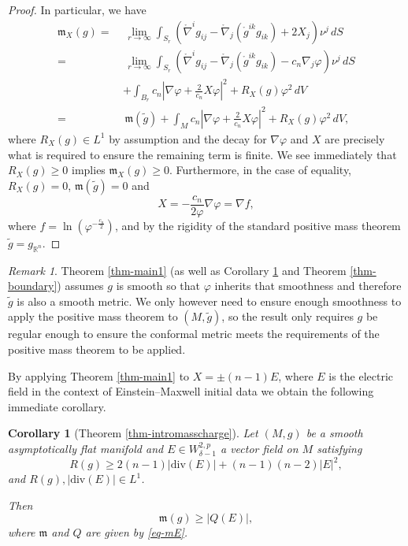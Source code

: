 \documentclass[a4paper,11pt,reqno]{amsart}
\theoremstyle{plain}
\newtheorem{cor}[thm]{Corollary}
\theoremstyle{definition}
\theoremstyle{remark}
\newtheorem{rem}[thm]{Remark}
\newcommand{\m}{\mathfrak{m}}
\def\onabla{\mathring \nabla}
\numberwithin{equation}{section}
\begin{document}
\begin{proof}
In particular, we have
\begin{align}
	\m_X(g)=\,&\,\lim_{r\to \infty}\int_{S_r} \left(\onabla^i g_{ij}-\onabla_j(\mathring g^{ik}g_{ik})+2X_j\right)\nu^j\,dS\nonumber\\\nonumber
	=\,&\, 	\lim_{r\to \infty}\int_{S_r} \left(\onabla^i g_{ij}-\onabla_j(\mathring g^{ik}g_{ik})-c_n\nabla_j\varphi\right)\nu^j\,dS\\\nonumber
	&+\int_{B_r} c_n\left| \nabla\varphi+\frac{2}{c_n}X\varphi\right|^2+R_X(g)\varphi^2\,dV\\
	=\,&\,\m(\widetilde g)+\int_{M} c_n\left| \nabla\varphi+\frac{2}{c_n}X\varphi\right|^2+R_X(g)\varphi^2\,dV,\label{eq-massdefect}
\end{align}
where $R_X(g)\in L^1$ by assumption and the decay for $\nabla\varphi$ and $X$ are precisely what is required to ensure the remaining term is finite. We see immediately that $R_X(g)\geq0$ implies $\m_X(g)\geq0$. Furthermore, in the case of equality, $R_X(g)=0$, $\m(\widetilde g)=0$ and
	\begin{equation}
		X=-\frac{c_n}{2\varphi}\nabla\varphi=\nabla f,
	\end{equation}
	where $f=\ln(\varphi^{-\frac{c_n}{2}})$, and by the rigidity of the standard positive mass theorem $\widetilde g=g_{\mathbb R^n}$.
\end{proof}
\begin{rem}
	Theorem \ref{thm-main1} (as well as Corollary \ref{cor-charge} and Theorem \ref{thm-boundary}) assumes $g$ is smooth so that $\varphi$ inherits that smoothness and therefore $\widetilde g$ is also a smooth metric. We only however need to ensure enough smoothness to apply the positive mass theorem to $(M,\widetilde g)$, so the result only requires $g$ be regular enough to ensure the conformal metric meets the requirements of the positive mass theorem to be applied.
\end{rem}

By applying Theorem \ref{thm-main1} to $X=\pm (n-1)E$, where $E$ is the electric field in the context of Einstein--Maxwell initial data we obtain the following immediate corollary.
\begin{cor}[Theorem \ref{thm-intromasscharge}]\label{cor-charge}
 Let $(M,g)$ be a smooth asymptotically flat manifold and $E\in W^{2,p}_{\delta-1}$ a vector field on $M$ satisfying
 \begin{equation*}
 	R(g)\geq 2(n-1)|\mathrm{div}(E)|+(n-1)(n-2)|E|^2,
 \end{equation*}
 and $R(g),|\mathrm{div}(E)|\in L^1$.
 
 Then
 \begin{equation*}
 	\m(g)\geq |Q(E)|,
 \end{equation*}	
 where $\m$ and $Q$ are given by \eqref{eq-mE}.
\end{cor}
\end{document}
